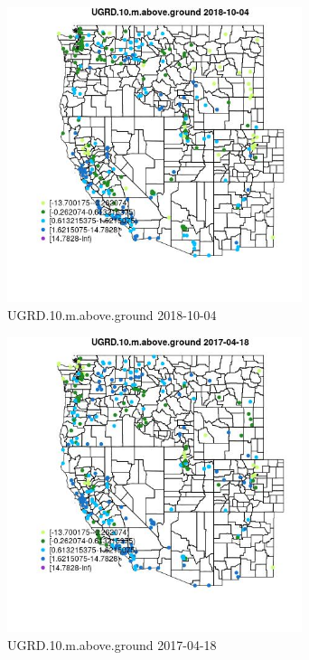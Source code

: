 \begin{figure} 
\centering  
\includegraphics[width=0.77\textwidth]{Code_Outputs/Report_ML_input_PM25_Step4_part_f_de_duplicated_aves_prioritize_24hr_obswNAs_MapObsUGRD10maboveground2018-10-04.jpg} 
\caption{\label{fig:Report_ML_input_PM25_Step4_part_f_de_duplicated_aves_prioritize_24hr_obswNAsMapObsUGRD10maboveground2018-10-04}UGRD.10.m.above.ground 2018-10-04} 
\end{figure} 
 

\begin{figure} 
\centering  
\includegraphics[width=0.77\textwidth]{Code_Outputs/Report_ML_input_PM25_Step4_part_f_de_duplicated_aves_prioritize_24hr_obswNAs_MapObsUGRD10maboveground2017-04-18.jpg} 
\caption{\label{fig:Report_ML_input_PM25_Step4_part_f_de_duplicated_aves_prioritize_24hr_obswNAsMapObsUGRD10maboveground2017-04-18}UGRD.10.m.above.ground 2017-04-18} 
\end{figure} 
 

